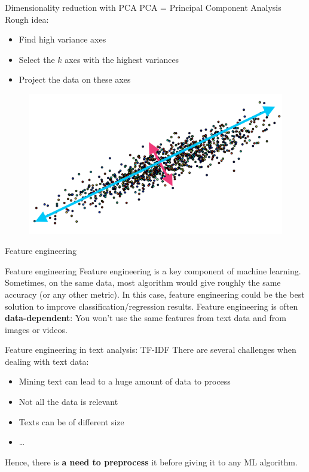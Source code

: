 \documentclass{beamer}
\newcommand{\1}[1]{\mathbbm{1}\left[#1\right]}
\begin{document}
\begin{frame}{Dimensionality reduction with PCA}
PCA = Principal Component Analysis
\vfill
\pause
Rough idea:
\begin{itemize}
	\item Find high variance axes
	\item Select the $k$ axes with the highest variances
	\item Project the data on these axes
\end{itemize}
\vfill
\pause
\begin{figure}
\centering
\includegraphics[width=\textwidth]{images/pca_illustration.png}
\end{figure}
\end{frame}

\begin{frame}
\begin{center}
\Huge{Feature engineering}
\end{center}
\end{frame}

\begin{frame}{Feature engineering}
Feature engineering is a key component of machine learning.
\vfill
\pause
Sometimes, on the same data, most algorithm would give roughly the same accuracy (or any other metric). In this case, feature engineering could be the best solution to improve classification/regression results.
\vfill
\pause 
Feature engineering is often \textbf{data-dependent}: You won't use the same features from text data and from images or videos.
\end{frame}

\begin{frame}{Feature engineering in text analysis: TF-IDF}
There are several challenges when dealing with text data:
\begin{itemize}
	\item Mining text can lead to a huge amount of data to process
	\item Not all the data is relevant 
	\item Texts can be of different size
	\item \ldots
\end{itemize}
\pause
\vfill
Hence, there is \textbf{a need to preprocess} it before giving it to any ML algorithm.
\end{frame}
\end{document}
